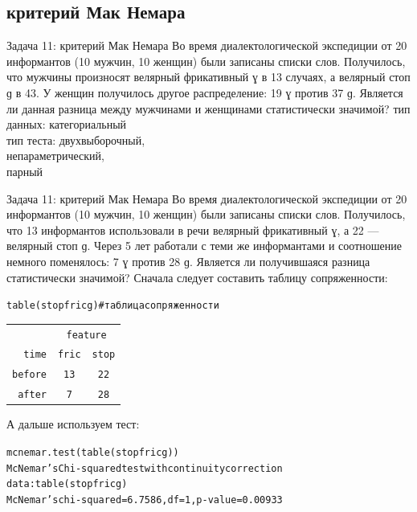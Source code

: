 \subsection{критерий Мак Немара}
\begin{frame}{Задача 11: критерий Мак Немара}
Во время диалектологической экспедиции от 20 информантов (10 мужчин, 10 женщин) были записаны списки слов. Получилось, что мужчины произносят велярный фрикативный ɣ в 13 случаях, а велярный стоп ɡ в 43. У женщин получилось другое распределение: 19 ɣ против 37 ɡ. Является ли данная разница между мужчинами и женщинами статистически значимой?
\vfill
тип данных: категориальный\\
тип теста: двухвыборочный,\\
непараметрический,\\
парный
\end{frame}
\begin{frame}{Задача 11: критерий Мак Немара}
Во время диалектологической экспедиции от 20 информантов (10 мужчин, 10 женщин) были записаны списки слов. Получилось, что 13 информантов использовали в речи велярный фрикативный ɣ, а 22 — велярный стоп ɡ. Через 5 лет работали с теми же информантами и соотношение немного поменялось: 7 ɣ против 28 ɡ. Является ли получившаяся разница статистически значимой?
\vfill
Сначала следует составить таблицу сопряженности:
\scriptsize
\begin{alltt}
\alert{table(stopfricg)}\hfill \# таблица сопряженности\medskip\\
\begin{tabular}{rcc}
 & \multicolumn{ 2}{c}{feature} \\ 
time & fric & stop \\ 
before & 13 & 22 \\ 
after & 7 & 28 \\ 
\end{tabular}
\end{alltt}
\normalsize
А дальше используем тест:
\scriptsize
\begin{alltt}
\alert{mcnemar.test(table(stopfricg))}\medskip\\
McNemar's Chi-squared test with continuity correction\\
data:  table(stopfricg)\\
McNemar's chi-squared = 6.7586, df = 1, p-value = 0.00933\\
\end{alltt}
\normalsize
\end{frame}
